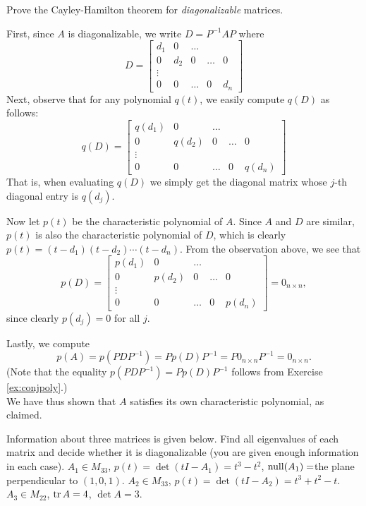 Prove the Cayley-Hamilton theorem for {\em diagonalizable} matrices. 
\\
\begin{solution}
\noindent 
First, since $A$ is diagonalizable, we write $D=P^{-1}AP$ where 
\[
D=\begin{bmatrix}
d_1&0&\dots \\
0&d_2&0&\dots &0\\
\vdots \\
0&0&\dots &0&d_n
\end{bmatrix} 
\]
Next, observe that for any polynomial $q(t)$, we easily compute $q(D)$ as follows: 
\[
q(D)=\begin{bmatrix}
q(d_1)&0&\dots \\
0&q(d_2)&0&\dots &0\\
\vdots \\
0&0&\dots &0&q(d_n)
\end{bmatrix} 
\]
That is, when evaluating $q(D)$ we simply get the diagonal matrix whose $j$-th diagonal entry is $q(d_j)$. 

Now let $p(t)$ be the characteristic polynomial of $A$. Since $A$ and $D$ are similar, $p(t)$ is also the characteristic polynomial of $D$, which is clearly $p(t)=(t-d_1)(t-d_2)\cdots (t-d_n)$. From the observation above, we see that 
\[
p(D)=\begin{bmatrix}
p(d_1)&0&\dots \\
0&p(d_2)&0&\dots &0\\
\vdots \\
0&0&\dots &0&p(d_n)
\end{bmatrix} 
=0_{n\times n},
\] 
since clearly $p(d_j)=0$ for all $j$. 

Lastly, we compute 
\[
p(A)=p(PDP^{-1})=Pp(D)P^{-1}=P0_{n\times n}P^{-1}=0_{n\times n}.
\]
(Note that the equality $p(PDP^{-1})=Pp(D)P^{-1}$ follows from Exercise \ref{ex:conjpoly}.)
\\
We have thus shown that $A$ satisfies its own characteristic polynomial, as claimed. 
\end{solution}
\ii Information about three matrices is given below. Find all eigenvalues of each matrix and decide whether it is diagonalizable (you are given enough information in each case).
\bb
\ii $A_1\in M_{33}$, $p(t)=\det(tI-A_1)=t^3-t^2$, $\operatorname{null}(A_1)=$the plane perpendicular to $(1,0,1)$.  
\ii $A_2\in M_{33}$, $p(t)=\det(tI-A_2)=t^3+t^2-t$.
\ii $A_3\in M_{22}$, $\operatorname{tr} A=4$, $\det A=3$. 
\ee
